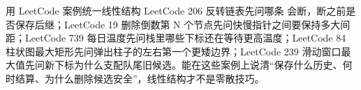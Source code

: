 \begin{principlebox}{用 LeetCode 案例统一线性结构}
LeetCode 206 反转链表先问哪条  会断，断之前是否保存后继；LeetCode 19 删除倒数第 N 个节点先问快慢指针之间要保持多大间距；LeetCode 739 每日温度先问栈里哪些下标还在等待更高温度；LeetCode 84 柱状图最大矩形先问弹出柱子的左右第一个更矮边界；LeetCode 239 滑动窗口最大值先问新下标为什么支配队尾旧候选。能在这些案例上说清“保存什么历史、何时结算、为什么删除候选安全”，线性结构才不是零散技巧。
\end{principlebox}






